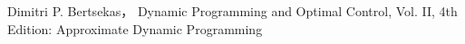 \begin{thebibliography}{99}
 Dimitri P. Bertsekas， Dynamic Programming and Optimal Control, Vol. II, 4th Edition: Approximate Dynamic Programming
\end{thebibliography}







